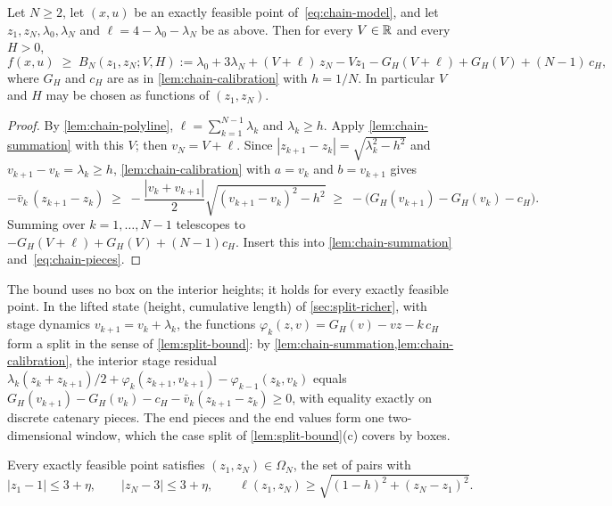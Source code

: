 \begin{proposition}\label{prop:chain-endvalue}
Let $N \ge 2$, let $(x,u)$ be an exactly feasible point of~\eqref{eq:chain-model}, and let $z_1, z_N, \lambda_0, \lambda_N$ and $\ell = 4 - \lambda_0 - \lambda_N$ be as above.
Then for every $V \in \mathbb{R}$ and every $H > 0$,
\begin{equation}\label{eq:chain-BN}
f(x,u) \;\ge\; B_N(z_1, z_N; V, H) := \lambda_0 + 3\lambda_N + (V + \ell)\,z_N - V z_1 - G_H(V + \ell) + G_H(V) + (N-1)\,c_H ,
\end{equation}
where $G_H$ and $c_H$ are as in \cref{lem:chain-calibration} with $h = 1/N$.
In particular $V$ and $H$ may be chosen as functions of $(z_1, z_N)$.
\end{proposition}

\begin{proof}
By \cref{lem:chain-polyline}, $\ell = \sum_{k=1}^{N-1}\lambda_k$ and $\lambda_k \ge h$.
Apply \cref{lem:chain-summation} with this $V$; then $v_N = V + \ell$.
Since $|z_{k+1} - z_k| = \sqrt{\lambda_k^2 - h^2}$ and $v_{k+1} - v_k = \lambda_k \ge h$, \cref{lem:chain-calibration} with $a = v_k$ and $b = v_{k+1}$ gives
\[
-\bar v_k\,(z_{k+1} - z_k) \;\ge\; -\frac{|v_k + v_{k+1}|}{2}\sqrt{(v_{k+1} - v_k)^2 - h^2} \;\ge\; -\bigl( G_H(v_{k+1}) - G_H(v_k) - c_H \bigr).
\]
Summing over $k = 1,\dots,N-1$ telescopes to $-G_H(V + \ell) + G_H(V) + (N-1)c_H$.
Insert this into \cref{lem:chain-summation} and~\eqref{eq:chain-pieces}.
\end{proof}

The bound uses no box on the interior heights; it holds for every exactly feasible point.
In the lifted state (height, cumulative length) of \cref{sec:split-richer}, with stage dynamics $v_{k+1}=v_k+\lambda_k$, the functions $\varphi_k(z,v)=G_H(v)-vz-k\,c_H$ form a split in the sense of \cref{lem:split-bound}: by \cref{lem:chain-summation,lem:chain-calibration}, the interior stage residual $\lambda_k(z_k+z_{k+1})/2+\varphi_k(z_{k+1},v_{k+1})-\varphi_{k-1}(z_k,v_k)$ equals $G_H(v_{k+1})-G_H(v_k)-c_H-\bar v_k(z_{k+1}-z_k)\ge0$, with equality exactly on discrete catenary pieces.
The end pieces and the end values form one two-dimensional window, which the case split of \cref{lem:split-bound}(c) covers by boxes.

\begin{lemma}\label{lem:chain-window}
Every exactly feasible point satisfies $(z_1, z_N) \in \Omega_N$, the set of pairs with
\[
|z_1 - 1| \le 3 + \eta,\qquad |z_N - 3| \le 3 + \eta,\qquad \ell(z_1, z_N) \ge \sqrt{(1-h)^2 + (z_N - z_1)^2} .
\]
\end{lemma}

